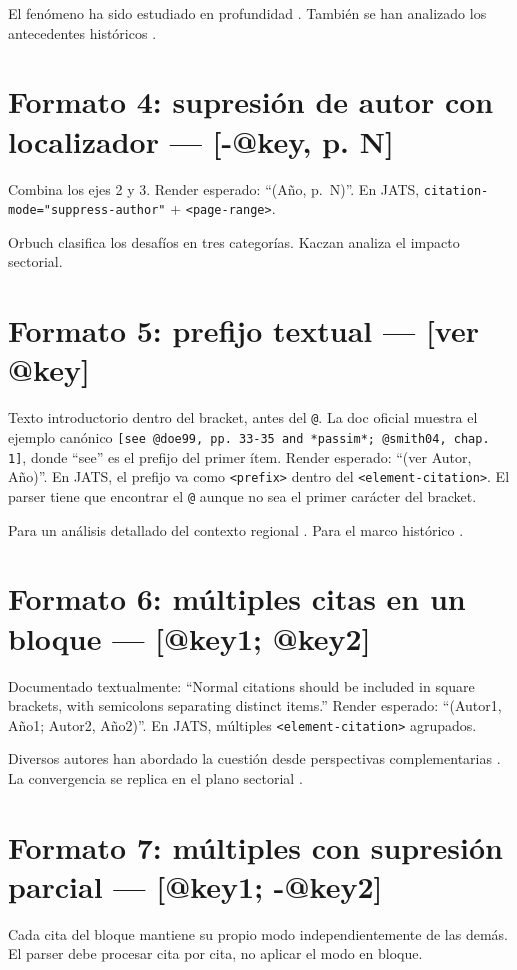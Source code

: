 \documentclass{article}
\begin{document}
El fenómeno ha sido estudiado en profundidad \autocite[p. 5]{2961-KACZAN2016}. También se han analizado los antecedentes históricos \autocite[pp. 55-60]{3041-PINEAU1999}.


\section{Formato 4: supresión de autor con localizador — [-@key, p. N]}
Combina los ejes 2 y 3. Render esperado: “(Año, p. N)”. En JATS, \texttt{citation-mode="suppress-author"} + \texttt{<page-range>}.

Orbuch \autocite*[p. 235]{3036-ORBUCH2020} clasifica los desafíos en tres categorías. Kaczan \autocite*[pp. 225-230]{2961-KACZAN2016} analiza el impacto sectorial.


\section{Formato 5: prefijo textual — [ver @key]}
Texto introductorio dentro del bracket, antes del \texttt{@}. La doc oficial muestra el ejemplo canónico \texttt{[see @doe99, pp. 33-35 and *passim*; @smith04, chap. 1]}, donde “see” es el prefijo del primer ítem. Render esperado: “(ver Autor, Año)”. En JATS, el prefijo va como \texttt{<prefix>} dentro del \texttt{<element-citation>}. El parser tiene que encontrar el \texttt{@} aunque no sea el primer carácter del bracket.

Para un análisis detallado del contexto regional \autocite[ver][]{3036-ORBUCH2020}. Para el marco histórico \autocite[cf.][]{3041-PINEAU1999}.


\section{Formato 6: múltiples citas en un bloque — [@key1; @key2]}
Documentado textualmente: “Normal citations should be included in square brackets, with semicolons separating distinct items.” Render esperado: “(Autor1, Año1; Autor2, Año2)”. En JATS, múltiples \texttt{<element-citation>} agrupados.

Diversos autores han abordado la cuestión desde perspectivas complementarias \autocite{2961-KACZAN2016,3041-PINEAU1999}. La convergencia se replica en el plano sectorial \autocite{3036-ORBUCH2020,2961-KACZAN2016}.


\section{Formato 7: múltiples con supresión parcial — [@key1; -@key2]}
Cada cita del bloque mantiene su propio modo independientemente de las demás. El parser debe procesar cita por cita, no aplicar el modo en bloque.
\end{document}
